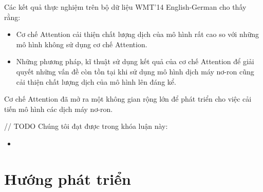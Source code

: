Các kết quả thực nghiệm trên bộ dữ liệu WMT'14 English-German cho thấy rằng:
\begin{itemize}
	\item Cơ chế Attention cải thiện chất lượng dịch của mô hình rất cao so với những mô hình không sử dụng cơ chế Attention.
	\item Những phương pháp, kĩ thuật sử dụng kết quả của cơ chế Attention để giải quyết những vấn đề còn tồn tại khi sử dụng mô hình dịch máy nơ-ron cũng cải thiện chất lượng dịch của mô hình lên đáng kể.
\end{itemize}

Cơ chế Attention đã mở ra một không gian rộng lớn để phát triển cho việc cải tiến mô hình các dịch máy nơ-ron.

// TODO Chúng tôi đạt được trong khóa luận này:
\begin{itemize}
	\item 
\end{itemize}

\section{Hướng phát triển}

